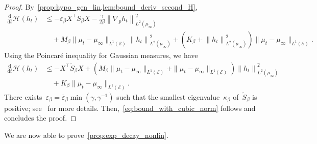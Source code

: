 \documentclass[onefignum,onetabnum]{siamart251216} %
\renewcommand{\d}{\mathrm{d}}
\newcommand{\norm}[1]{\left\lVert#1\right\rVert}
\newcommand{\mc}[1]{\mathcal{#1}}
\renewcommand{\leq}{\leqslant}
\newcommand{\mescin}{\mu}
\newcommand{\norml}[1]{\norm{#1}_{L^2(\mescin_\infty)}}
\newcommand{\eps}{\varepsilon}
\theoremstyle{plain}
\numberwithin{equation}{section}
\numberwithin{theorem}{section}
\begin{document}
\begin{proof}
    By~\cref{prop:hypo_gen_lin,lem:bound_deriv_second_H},
    \begin{align*}
        \frac{\d}{\d t}\mc{H}(h_t) &\leq -\eps_\beta X^\top S_\beta X - \frac{\gamma}{2\beta}\norml{\nabla_p h_t}^2\\
        &\quad + M_\beta \|\mescin_t - \mescin_\infty\|_{L^1(\mc{E})} \norml{h_t}^2
        + \left(K_\beta + \norml{h_t}^2\right)\|\mescin_t - \mescin_\infty\|_{L^1(\mc{E})}.
    \end{align*}
    Using the Poincaré inequality for Gaussian measures, we have
    \begin{align*}
        \frac{\d}{\d t}\mc{H}(h_t)
        &\leq -X^\top \widetilde S_{\beta} X
        + \left( M_\beta \|\mescin_t - \mescin_\infty\|_{L^1(\mc{E})}
        + \|\mescin_t - \mescin_\infty\|_{L^1(\mc{E})}\right)\!\norml{h_t}^2 \\
        &\quad + K_\beta \|\mescin_t - \mescin_\infty\|_{L^1(\mc{E})}.
    \end{align*}
    There exists~$\eps_{\beta} = \overline{\eps}_{\beta}\min(\gamma,\gamma^{-1})$ such that the smallest eigenvalue~$\kappa_{\beta}$ of~$\widetilde S_{\beta}$ is positive; see~\cite[Proof of Proposition 1]{roussel2018spectral} for more details. Then,~\eqref{eq:bound_with_cubic_norm} follows and concludes the proof.
\end{proof}
We are now able to prove~\cref{prop:exp_decay_nonlin}.
\end{document}
